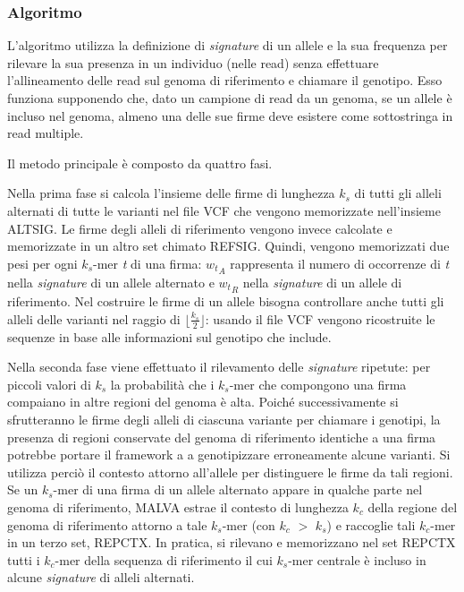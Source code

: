 \documentclass[../main.tex]{subfiles}
\begin{document}
\subsubsection{Algoritmo}

L'algoritmo utilizza la definizione di \textit{signature} di un allele e la sua frequenza per rilevare la sua presenza in un individuo (nelle read) senza effettuare l'allineamento delle read sul genoma di riferimento e chiamare il genotipo. Esso funziona supponendo che, dato un campione di read da un genoma, se un allele è incluso nel genoma, almeno una delle sue firme deve esistere come sottostringa in read multiple.

Il metodo principale è composto da quattro fasi.

Nella prima fase si calcola l'insieme delle firme di lunghezza \textit{${k}_{s}$} di tutti gli alleli alternati di tutte le varianti nel file VCF che vengono memorizzate nell'insieme ALTSIG. Le firme degli alleli di riferimento vengono invece calcolate e memorizzate in un altro set chimato REFSIG. Quindi, vengono memorizzati due pesi per ogni \textit{${k}_{s}$}-mer \textit{t} di una firma: \textit{${w_{t}}_{A}$} rappresenta il numero di occorrenze di \textit{t} nella \textit{signature} di un allele alternato e \textit{${w_{t}}_{R}$} nella \textit{signature} di un allele di riferimento. Nel costruire le firme di un allele bisogna controllare anche tutti gli alleli delle varianti nel raggio di $\lfloor \frac{ {{{k}_{s}} }}{2}  \rfloor$: usando il file VCF vengono ricostruite le sequenze in base alle informazioni sul genotipo che include. 

Nella seconda fase viene effettuato il rilevamento delle \textit{signature} ripetute: per piccoli valori di  \textit{${k}_{s}$} la probabilità che i  \textit{${k}_{s}$}-mer che compongono una firma compaiano in altre regioni del genoma è alta. Poiché successivamente si sfrutteranno le firme degli alleli di ciascuna variante per chiamare i genotipi, la presenza di regioni conservate del genoma di riferimento identiche a una firma potrebbe portare il framework a a genotipizzare erroneamente alcune varianti. Si utilizza perciò il contesto attorno all'allele per distinguere le firme da tali regioni. Se un  \textit{${k}_{s}$}-mer di una firma di un allele alternato appare in qualche parte nel genoma di riferimento, MALVA estrae il contesto di lunghezza  \textit{${k}_{c}$} della regione del genoma di riferimento attorno a tale  \textit{${k}_{s}$}-mer (con  \textit{${k}_{c}$} $>$  \textit{${k}_{s}$}) e raccoglie tali  \textit{${k}_{c}$}-mer in un terzo set, REPCTX. In pratica, si rilevano e memorizzano nel set REPCTX  tutti i  \textit{${k}_{c}$}-mer della sequenza di riferimento il cui \textit{${k}_{s}$}-mer centrale è incluso in alcune \textit{signature} di alleli alternati. 
\end{document}
